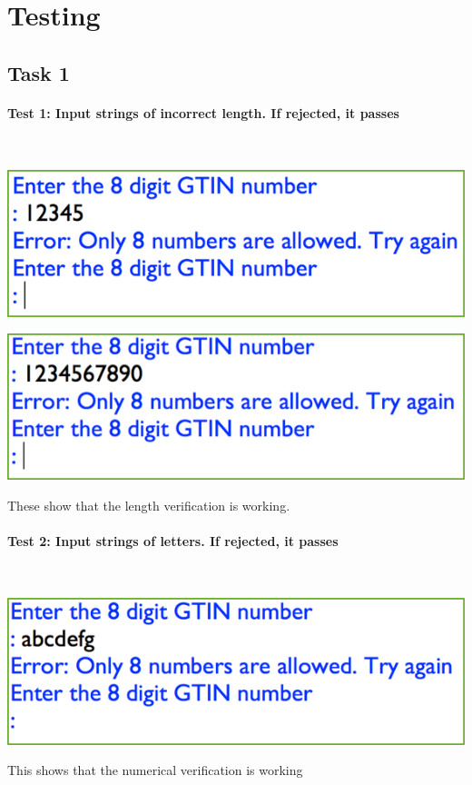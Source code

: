 \documentclass[a4paper]{article}
\begin{document}
\newpage

\section{Testing}
\subsection{Task 1}
\paragraph{Test 1: Input strings of incorrect length. If rejected, it passes} ~\par
\noindent\includegraphics{testing_1.png} \par 
\noindent\includegraphics{testing_2.png} \par 
These show that the length verification is working.
\paragraph{Test 2: Input strings of letters. If rejected, it passes} ~\par 
\noindent\includegraphics{testing_3.png} \par 
This shows that the numerical verification is working
\end{document}
